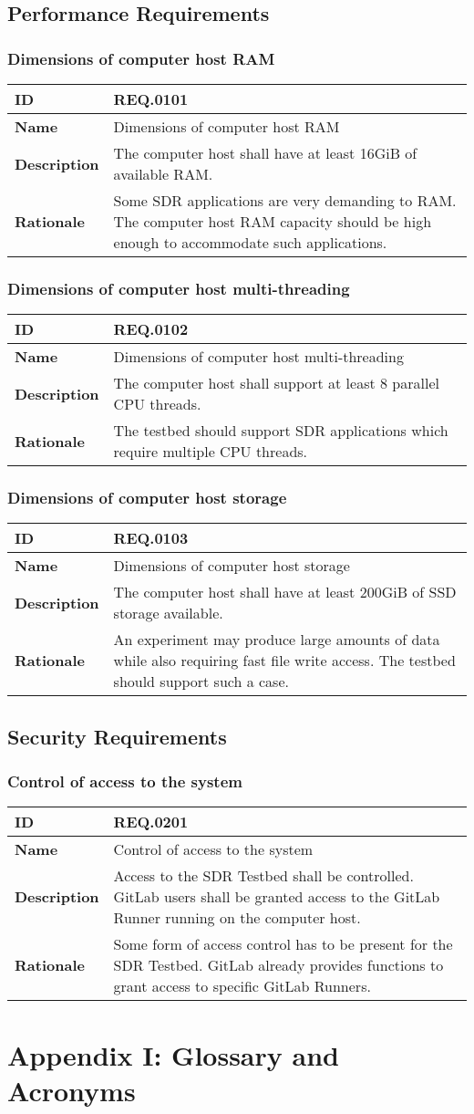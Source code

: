 \documentclass[english,titlepage,a4paper]{report}
\newcommand{\requirement}[5]{
  \subsection{#2}
  #5

  \noindent
  \begin{tabular}{|l|p{9cm}|}
    \hline
    \textbf{ID} & #1 \\
    \hline
    \textbf{Name} & #2 \\
    \hline
    \textbf{Description} & #3 \\
    \hline
    \textbf{Rationale} & #4 \\
    \hline
  \end{tabular}
}
\begin{document}
\section{Performance Requirements}

\requirement{REQ.0101}{Dimensions of computer host RAM}{
  The computer host shall have at least 16GiB of available RAM.
}{
  Some SDR applications are very demanding to RAM.
  The computer host RAM capacity should be high enough to accommodate such applications.
}{}
\requirement{REQ.0102}{Dimensions of computer host multi-threading}{
  The computer host shall support at least 8 parallel CPU threads.
}{
  The testbed should support SDR applications which require multiple CPU threads.
}{}
\requirement{REQ.0103}{Dimensions of computer host storage}{
  The computer host shall have at least 200GiB of SSD storage available.
}{
  An experiment may produce large amounts of data while also requiring fast file write access.
  The testbed should support such a case.
}{}

\section{Security Requirements}

\requirement{REQ.0201}{Control of access to the system}{
  Access to the SDR Testbed shall be controlled.
  GitLab users shall be granted access to the GitLab Runner running on the computer host.
}{
  Some form of access control has to be present for the SDR Testbed.
  GitLab already provides functions to grant access to specific GitLab Runners.
}{}


\chapter*{Appendix I: Glossary and Acronyms}

\printglossary
\printglossary[type=\acronymtype]
\end{document}
